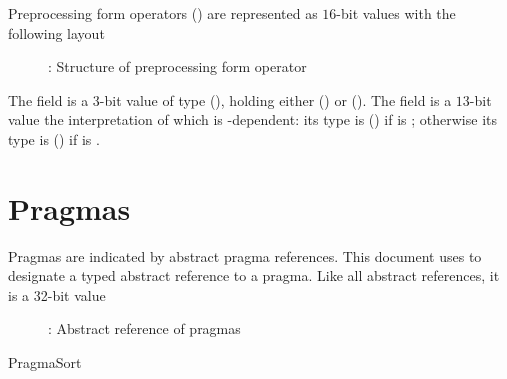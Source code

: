 Preprocessing form operators () are
represented as $16$-bit values with the following layout
%
\begin{figure}[H]
	\centering
	  \begin{BasicAbstractReferenceLayout}{16}
	  \end{BasicAbstractReferenceLayout} 
	  \caption{: Structure of preprocessing form operator}
	  \label{fig:ifc-preprocessing-operator}
\end{figure}
%
The field  is a $3$-bit value of type 
(), holding either 
() 
or  ().
The field  is a $13$-bit value the interpretation of which 
is -dependent: its type is  
()
if  is ; 
otherwise its type is
 () 
if  is .

\section{Pragmas}
\label{sec:ifc-pragma-form}


Pragmas are indicated by abstract pragma references.  This document
uses  to designate a typed abstract reference to a
pragma.  Like all abstract references, it is a 32-bit value
\begin{figure}[htbp]
  \centering
  \caption{: Abstract reference of pragmas}
  \label{fig:ifc-pragma-index}
\end{figure}

\begin{SortEnum}{PragmaSort}
\end{SortEnum}
